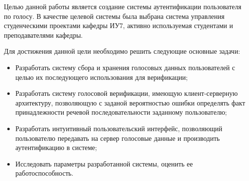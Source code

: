 \Intro


Целью данной работы является создание системы аутентификации пользователя по голосу.
В качестве целевой системы была выбрана система управления студенческими проектами кафедры ИУ7, активно используемая студентами и преподавателями кафедры.


Для достижения данной цели необходимо решить следующие основные задачи:
\begin{itemize}
\item Разработать систему сбора и хранения голосовых данных пользователей с целью их последующего использования для верификации;
\item Разработать систему голосовой верификации, имеющую клиент-серверную архитектуру, позволяющую с заданой вероятностью ошибки определять факт принадлежности речевой последовательности заданному пользователю;
\item Разработать интуитивный пользовательский интерфейс, позволяющий пользователю передавать на сервер голосовые данные и производить аутентификацию в системе;
\item Исследовать параметры разработанной системы, оценить ее работоспособность.
\end{itemize}

